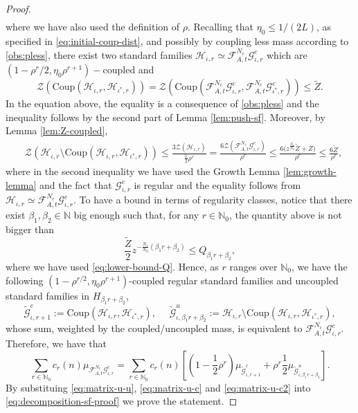 \documentclass{amsart}
\numberwithin{equation}{section}
\renewcommand{\le}{\leqslant}
\newcommand\cF{{\mathcal F}}
\newcommand\cG{{\mathcal G}}
\newcommand\cH{{\mathcal H}}
\newcommand\cZ{{\mathcal Z}}
\newcommand\bN{{\mathbb N}}
\newcommand{\catt}{\cF_{A,t}}
\newcommand{\Coup}{\text{Coup}}
\begin{document}
\begin{proof}
\[\begin{split}
\end{split}
\]
where we have also used the definition of \(\rho\). Recalling that \(\eta_0 \le 1/(2L)\), as specified in \eqref{eq:initial-coup-dist}, and possibly by coupling less mass according to \ref{obs:pless}, there exist two standard families \(\cH_{\iota,r} \simeq \catt^{N_c}\cG_{\iota,r}^{c}\) which are \((1 - \rho^r/2, \eta_0 \rho^{r+1})-\)coupled and 
\[
\cZ(\Coup(\cH_{\iota,r}, \cH_{\iota^{*},r})) = \cZ(\Coup(\catt^{N_c}\cG_{\iota,r}^{c},\catt^{N_c}\cG_{\iota^{*},r}^{c})) \le \widetilde Z.
\]
In the equation above, the equality is a consequence of \ref{obs:pless} and the inequality follows by the second part of Lemma \ref{lem:push-sf}. Moreover, by Lemma \ref{lem:Z-coupled},
\[
\begin{split}
&\cZ \left(\cH_{\iota,r} \! \setminus \!\Coup (\cH_{\iota,r}, \cH_{\iota^{*},r}) \right) \!\le \!\frac{3 \cZ(\cH_{\iota,r})}{\frac{1}{2} \rho^{r}} \!=\! \frac{6\cZ(\catt^{N_c}\cG_{\iota,r}^{c})}{\rho^r}\!\le\! \frac{6\bigl(z^{\frac{N_c}{N_0}}\widetilde Z + Z\bigr) }{\rho^{r}} \!\le\!  \frac{6\widetilde Z}{\rho^r},
\end{split}
\]
where in the second inequality we have used the Growth Lemma \ref{lem:growth-lemma} and the fact that \(\cG_{\iota,r}^{c}\) is regular and the equality follows from \(\cH_{\iota,r} \simeq \catt^{N_c}\cG_{\iota,r}^{c}\). To have a bound in terms of regularity classes, notice that there exist \(\beta_1, \beta_2 \in \bN\) big enough such that, for any \(r \in \bN_0\), the quantity above is not bigger than
\[
\frac{\widetilde Z}{2}z^{-\frac{N_c}{N_0}(\beta_1 r + \beta_2)} \le Q_{ \beta_1 r  + \beta_2 },
\]
where we have used \eqref{eq:lower-bound-Q}. Hence, as \(r\) ranges over \(\bN_0\), we have the following \((1-\rho^{r/2}, \eta_0 \rho^{r+1})\)-coupled regular standard families and uncoupled standard families in \(H_{\beta_1 r + \beta_2} \), 
\[
\widetilde \cG_{\iota,r+1}^c :=  \Coup (\cH_{\iota,r}, \cH_{\iota^*,r}), \text{ } \text{ } \widetilde \cG_{\iota, \beta_1 r + \beta_2}^{u} := \cH_{\iota,r} \setminus  \Coup (\cH_{\iota,r}, \cH_{\iota^*,r}),
\]
whose sum, weighted by the coupled/uncoupled mass, is equivalent to \(\catt^{N_c}\cG_{\iota,r}^{c}\). Therefore, we have that
\begin{equation}\label{eq:matrix-u-c2}
\sum_{r \in \bN_0} c_r(n) \mu_{\catt^{N_c}\cG_{\iota,r}^c} = \sum_{r \in \bN_0} c_r(n) \left[ \left(1- \frac 1 2 \rho^r\right) \mu_{\widetilde \cG_{\iota,r+1}^c} + \rho^r\frac 1 2 \mu_{\widetilde \cG_{\iota, \beta_1 r + \beta_2}^{u}}\right].
\end{equation}
By substituing \eqref{eq:matrix-u-u}, \eqref{eq:matrix-u-c} and \eqref{eq:matrix-u-c2} into \eqref{eq:decomposition-sf-proof} we prove the statement.


\end{proof}
\end{document}
